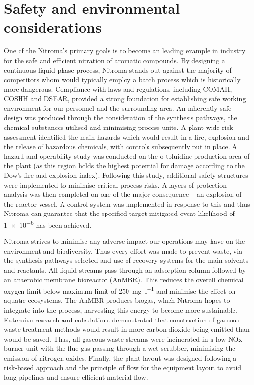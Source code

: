 \section*{Safety and environmental considerations}

 One of the Nitroma's primary goals is to become an leading example in industry for the safe and efficient nitration of aromatic compounds. By designing a continuous liquid-phase process, Nitroma stands out against the majority of competitors whom would typically employ a batch process which is historically more dangerous. Compliance with laws and regulations, including COMAH, COSHH and DSEAR, provided a strong foundation for establishing safe working environment for our personnel and the surrounding area. An inherently safe design was produced through the consideration of the synthesis pathways, the chemical substances utilised and minimising process units. A plant-wide risk assessment identified the main hazards which would result in a fire, explosion and the release of hazardous chemicals, with controls subsequently put in place. A hazard and operability study was conducted on the o-toluidine production area of the plant (as this region holds the highest potential for damage according to the Dow's fire and explosion index). Following this study, additional safety structures were implemented to minimise critical process risks. A layers of protection analysis was then completed on one of the major consequence – an explosion of the reactor vessel. A control system was implemented in response to this and thus Nitroma can guarantee that the specified target mitigated event likelihood of \num{1e-6} has been achieved.

Nitroma strives to minimise any adverse impact our operations may have on the environment and biodiversity. Thus every effort was made to prevent waste, via the synthesis pathways selected and use of recovery systems for the main solvents and reactants. All liquid streams pass through an adsorption column followed by an anaerobic membrane bioreactor (AnMBR). This reduces the overall chemical oxygen limit below maximum limit of \SI{250}{\mg\per\litre} and minimise the effect on aquatic ecosystems. The AnMBR produces biogas, which Nitroma hopes to integrate into the process, harvesting this energy to become more sustainable. Extensive research and calculations demonstrated that construction of gaseous waste treatment methods would result in more carbon dioxide being emitted than would be saved. Thus, all gaseous waste streams were incinerated in a low-NOx burner unit with the flue gas passing through a wet scrubber, minimising the emission of nitrogen oxides. Finally, the plant layout was designed following a risk-based approach and the principle of flow for the equipment layout to avoid long pipelines and ensure efficient material flow. 